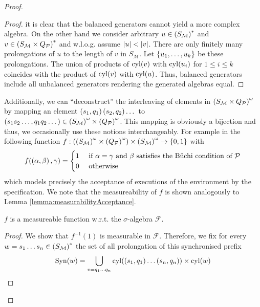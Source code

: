 \begin{proof}
\begin{proof}
  it is clear that the balanced generators cannot yield a more complex algebra.
  On the other hand we consider arbitrary $u\in \left(S_{\mathcal{M}}\right)^{*}$
  and $v\in \left(S_{\mathcal{M}}\times Q_{\mathcal{P}}\right)^{*}$ and w.l.o.g.
  assume $\left\vert{u}\right\vert<\left\vert{v}\right\vert$. There are only finitely many prolongations of $u$
  to the length of $v$ in $S_{\mathcal{M}}$. Let $\left\{u_{1},\dots,u_{k}\right\}$ be
  these prolongations. The union of products of $\operatorname{cyl}(v)$ with $\operatorname{cyl}(u_{i})$
  for $1\leq i\leq k$ coincides with the product of $\operatorname{cyl}(v)$ with $\operatorname{cyl}(u)$.
  Thus, balanced generators include all unbalanced generators rendering the
  generated algebras equal.
\end{proof}
Additionally, we can \enquote{deconstruct} the interleaving of elements in
$\left(S_{\mathcal{M}}\times Q_{\mathcal{P}}\right)^{\omega}$ by mapping an element
$\left(s_{1},q_{1}\right)\left(s_{2},q_{2}\right)\dots$ to
$\left(s_{1}s_{2}\dots,q_{1}q_{2}\dots\right)\in
\left(S_{\mathcal{M}}\right)^{\omega}\times\left(Q_{\mathcal{P}}\right)^{\omega}$. This
mapping is obviously a bijection and thus, we occasionally use these notions
interchangeably. For example in the following function
$f:\left(\left(S_{\mathcal{M}}\right)^{\omega}\times
\left(Q_{\mathcal{P}}\right)^{\omega}\right)\times\left(S_{\mathcal{M}}\right)^{\omega}
\rightarrow\left\{0,1\right\}$ with
\begin{equation*}
  f(\left(\alpha,\beta\right),\gamma) =
  \begin{cases}
    1&\text{ if }\alpha = \gamma\text{ and }\beta
    \text{ satisfies the Büchi condition of }\mathcal{P}\\
    0&\text{ otherwise}
  \end{cases}
\end{equation*}
which models precisely the acceptance of executions of the environment by the
specification. We note that the measureability of $f$ is shown analogously to
Lemma \ref{lemma:measurabilityAcceptance}.
\begin{lemma}
  $f$ is a measureable function w.r.t. the $\sigma$-algebra $\mathcal{F}$.
\end{lemma}
\begin{proof}
  We show that $f^{-1}(1)$ is measurable in $\mathcal{F}$. Therefore, we fix
  for every $w = s_{1}\dots s_{n}\in \left(S_{\mathcal{M}}\right)^{*}$ the set of
  all prolongation of this synchronised prefix
  \begin{equation*}
    \operatorname{Syn}(w) = \bigcup_{v = q_{1}\dots q_{n}}\operatorname{cyl}(\left(s_{1},q_{1}\right)\dots
    \left(s_{n},q_{n}\right))\times\operatorname{cyl}(w)
  \end{equation*}

\end{proof}
\end{proof}
